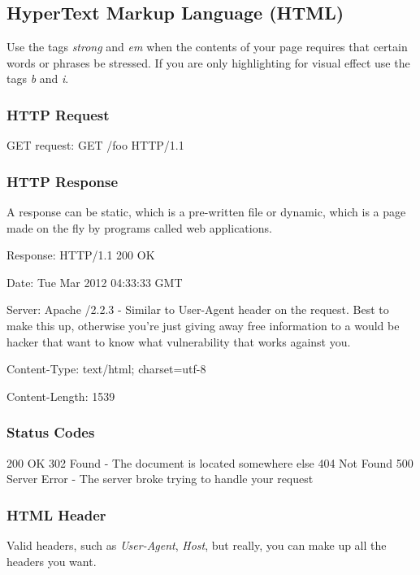 \documentclass[12pt]{article}
\begin{document}
\subsection*{HyperText Markup Language (HTML)}
Use the tags \emph{strong} and \emph{em} when the contents of your page requires that certain words or phrases be stressed. If you are only highlighting for visual effect use the tags \emph{b} and \emph{i}.

\subsubsection*{HTTP Request}
GET request: GET /foo HTTP/1.1

\subsubsection*{HTTP Response}
A response can be static, which is a pre-written file or dynamic, which is a page made on the fly by programs called web applications.

\begin{list}{*}{
\setlength{\itemsep}{0pt}
\setlength{\parsep}{0pt}
\setlength{\topsep}{0pt}
\setlength{\partopsep}{0pt}
\setlength{\leftmargin}{2em}
\setlength{\labelwidth}{1.5em}
\setlength{\labelsep}{0.5em}
}
\item Response: HTTP/1.1 200 OK
\item Date: Tue Mar 2012 04:33:33 GMT
\item Server: Apache /2.2.3 - Similar to User-Agent header on the request. Best to make this up, otherwise you're just giving away free information to a would be hacker that want to know what vulnerability that works against you.
\item Content-Type: text/html; charset=utf-8
\item Content-Length: 1539
\end{list}

\subsubsection*{Status Codes}
200 OK
302 Found - The document is located somewhere else
404 Not Found
500 Server Error - The server broke trying to handle your request

\subsubsection*{HTML Header}
Valid headers, such as \emph{User-Agent}, \emph{Host}, but really, you can make up all the headers you want.
\end{document}
